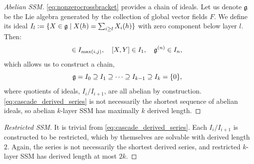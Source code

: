 \begin{proof}[Abelian SSM]
    \cref{eq:nonzerocrossbracket} provides a chain of ideals.
    Let us denote $\mathfrak{g}$ be the Lie algebra generated by the collection of global vector fields $F$.
    We define its ideal $I_{l} := \{X \in \mathfrak{g} \mid X(h) = \sum_{i \ge l} X_i(h)\}$ with zero component below layer $l$.
    Then:
    \begin{equation*}
        [X_i,Y_j] \in I_{\max (i,j)},
        \quad
        [X,Y] \in I_1,
        \quad
        \fr{g}^{(n)} \in I_n,
    \end{equation*}
    which allows us to construct a chain,
    \begin{equation}
    \label{eq:cascade_derived_series}
        \mathfrak{g} = I_0 \supseteq I_1 \supseteq \cdots \supseteq I_{k-1} \supseteq I_k = \{0\},
    \end{equation}
    where quotients of ideals, $I_i / I_{i+1}$, are all abelian by construction.
    \cref{eq:cascade_derived_series} is not necessarily the shortest sequence of abelian ideals,
    so abelian $k$-layer SSM has maximally $k$ derived length.
\end{proof}
\begin{proof}[Restricted SSM]
    It is trivial from \cref{eq:cascade_derived_series}.
    Each $I_i / I_{i+1}$ is constructed to be restricted,
    which by themselves are solvable with derived length $2$.
    Again, the series is not necessarily the shortest derived series,
    and restricted $k$-layer SSM has derived length at most $2k$.
\end{proof}

